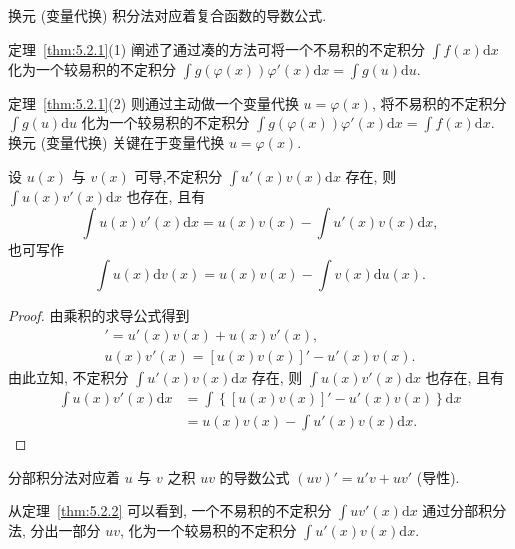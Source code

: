 换元 (变量代换) 积分法对应着复合函数的导数公式.

定理~\ref{thm:5.2.1}(1) 阐述了通过凑的方法可将一个不易积的不定积分 $\int f(x)\mathrm{d}x$ 化为一个较易积的不定积分 $\int g(\varphi(x))\varphi'(x)\mathrm{d}x=\int g(u)\mathrm{d}u$.

定理~\ref{thm:5.2.1}(2) 则通过主动做一个变量代换 $u=\varphi(x)$, 将不易积的不定积分 $\int g(u)\mathrm{d}u$ 化为一个较易积的不定积分 $\int g(\varphi(x))\varphi'(x)\mathrm{d}x=\int f(x)\mathrm{d}x$. 换元 (变量代换) 关键在于变量代换 $u=\varphi(x)$.

\begin{theorem}[分部积分法]\label{thm:5.2.2}
设 $u(x)$ 与 $v(x)$ 可导,\linebreak[4]不定积分 $\int u'(x)v(x)\mathrm{d}x$ 存在, 则 $\int u(x)v'(x)\mathrm{d}x$ 也存在, 且有
\[
\int u(x)v'(x)\mathrm{d}x=u(x)v(x)-\int u'(x)v(x)\mathrm{d}x,
\]
也可写作
\[
\int u(x)\mathrm{d}v(x)=u(x)v(x)-\int v(x)\mathrm{d}u(x).
\]
\end{theorem}

\begin{proof}
由乘积的求导公式得到
\begin{gather*}
[u(x)v(x)]'=u'(x)v(x)+u(x)v'(x),\\
u(x)v'(x)=[u(x)v(x)]'-u'(x)v(x).
\end{gather*}
由此立知, 不定积分 $\int u'(x)v(x)\mathrm{d}x$ 存在, 则 $\int u(x)v'(x)\mathrm{d}x$ 也存在, 且有
\begin{align*}
\int u(x)v'(x)\mathrm{d}x&=\int\left\{[u(x)v(x)]'-u'(x)v(x)\right\}\mathrm{d}x\\
&=u(x)v(x)-\int u'(x)v(x)\mathrm{d}x.
\end{align*}
\end{proof}

分部积分法对应着 $u$ 与 $v$ 之积 $uv$ 的导数公式 $(uv)'=u'v+uv'$ (导性).

从定理~\ref{thm:5.2.2} 可以看到, 一个不易积的不定积分 $\int uv'(x)\mathrm{d}x$ 通过分部积分法, 分出一部分 $uv$, 化为一个较易积的不定积分 $\int u'(x)v(x)\mathrm{d}x$.

